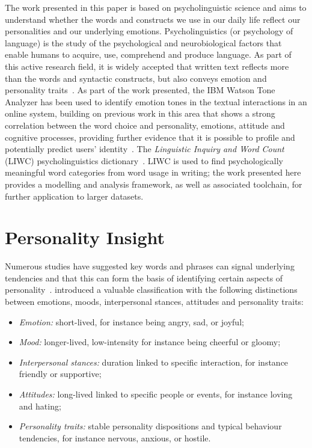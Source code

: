 \documentclass[graybox]{svmult}
\begin{document}
The work presented in this paper is based on psycholinguistic science
and aims to understand whether the words and constructs we use in our
daily life reflect our personalities and our underlying
emotions. Psycholinguistics (or psychology of language) is the study
of the psychological and neurobiological factors that enable humans to
acquire, use, comprehend and produce language.  As part of this active
research field, it is widely accepted that written text reflects more
than the words and syntactic constructs, but also conveys emotion and
personality traits~\citep{pennebaker+king:1999}. As part of the work
presented, the IBM Watson Tone Analyzer has been used to identify
emotion tones in the textual interactions in an online system,
building on previous work in this area that shows a strong correlation
between the word choice and personality, emotions, attitude and
cognitive processes, providing further evidence that it is possible to
profile and potentially predict users’
identity~\citep{fast+funder:2008}. The {\emph{Linguistic Inquiry and
Word Count}} (LIWC) psycholinguistics
dictionary~\citep{pennebaker-et-al:2001,tausczik+pennebaker:2010}.
LIWC is used to find psychologically meaningful word categories from
word usage in writing; the work presented here provides a modelling
and analysis framework, as well as associated toolchain, for further
application to larger datasets.


\section{Personality Insight}\label{personality}

Numerous studies have suggested key words and phrases can signal
underlying tendencies and that this can form the basis of identifying
certain aspects of
personality~\citep{woodworth-et-al:2012,iacobelli-et-al:2011,pennebaker+king:1999,oberlander+gill:2004,oberlander+gill:2006}.
\citet{scherer:1984} introduced a valuable classification with the
following distinctions between emotions, moods, interpersonal stances,
attitudes and personality traits:

\begin{itemize}
\item {\emph{Emotion:}} short-lived, for instance being angry, sad, or joyful;
\item {\emph{Mood:}} longer-lived, low-intensity for instance being cheerful or gloomy;
\item {\emph{Interpersonal stances:}} duration linked to specific
  interaction, for instance friendly or supportive;
\item {\emph{Attitudes:}} long-lived linked to specific people or
  events, for instance loving and hating;
\item {\emph{Personality traits:}} stable personality dispositions and
  typical behaviour tendencies, for instance nervous, anxious, or hostile.
\end{itemize}
\end{document}
